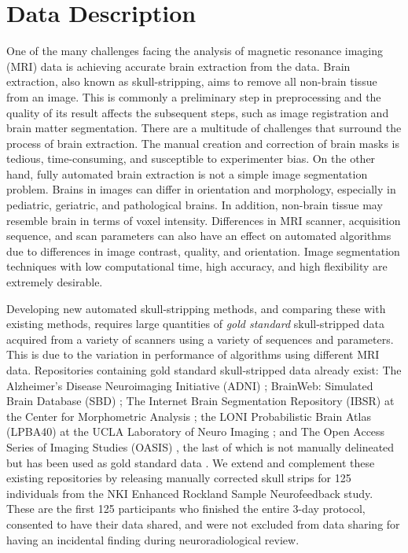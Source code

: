 \section*{Data Description}

\par One of the many challenges facing the analysis of magnetic resonance imaging (MRI) data is achieving accurate brain extraction from the data. Brain extraction, also known as skull-stripping, aims to remove all non-brain tissue from an image. This is commonly a preliminary step in preprocessing and the quality of its result affects the subsequent steps, such as image registration and brain matter segmentation. There are a multitude of challenges that surround the process of brain extraction. The manual creation and correction of brain masks is tedious, time-consuming, and susceptible to experimenter bias. On the other hand, fully automated brain extraction is not a simple image segmentation problem. Brains in images can differ in orientation and morphology, especially in pediatric, geriatric, and pathological brains. In addition, non-brain tissue may resemble brain in terms of voxel intensity. Differences in MRI scanner, acquisition sequence, and scan parameters can also have an effect on automated algorithms due to differences in image contrast, quality, and orientation. Image segmentation techniques with low computational time, high accuracy, and high flexibility are extremely desirable.
\par Developing new automated skull-stripping methods, and comparing these with existing methods, requires large quantities of \emph{gold standard} skull-stripped data acquired from a variety of scanners using a variety of sequences and parameters. This is due to the variation in performance of algorithms using different MRI data. Repositories containing gold standard skull-stripped data already exist: The Alzheimer's Disease Neuroimaging Initiative (ADNI) \cite{pmid17476317}; BrainWeb: Simulated Brain Database (SBD) \cite{brainweb}; The Internet Brain Segmentation Repository (IBSR) at the Center for Morphometric Analysis \cite{IBSR}; the LONI Probabilistic Brain Atlas (LPBA40) at the UCLA Laboratory of Neuro Imaging \cite{lpba40}; and The Open Access Series of Imaging Studies (OASIS) \cite{oasis}, the last of which is not manually delineated but has been used as gold standard data \cite{Iglesias2011, MASS}. We extend and complement these existing repositories by releasing manually corrected skull strips for 125 individuals from the NKI Enhanced Rockland Sample Neurofeedback study. These are the first 125 participants who finished the entire 3-day protocol, consented to have their data shared, and were not excluded from data sharing for having an incidental finding during neuroradiological review.  


